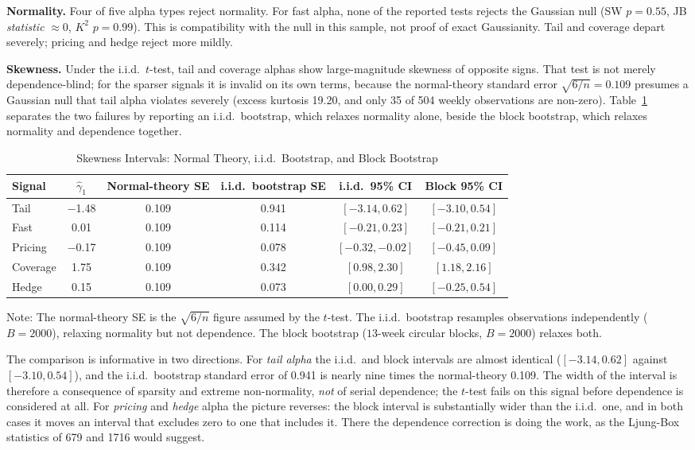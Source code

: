 \documentclass[11pt]{article}
\begin{document}
\textbf{Normality.} Four of five alpha types reject normality. For fast alpha, none of the reported tests rejects the Gaussian null (SW $p = 0.55$, JB \emph{statistic} $\approx 0$, $K^2$ $p = 0.99$). This is compatibility with the null in this sample, not proof of exact Gaussianity. Tail and coverage depart severely; pricing and hedge reject more mildly.

\textbf{Skewness.} Under the i.i.d.\ $t$-test, tail and coverage alphas show large-magnitude skewness of opposite signs. That test is not merely dependence-blind; for the sparser signals it is invalid on its own terms, because the normal-theory standard error $\sqrt{6/n} = 0.109$ presumes a Gaussian null that tail alpha violates severely (excess kurtosis 19.20, and only 35 of 504 weekly observations are non-zero). Table~\ref{tab:bootcompare} separates the two failures by reporting an i.i.d.\ bootstrap, which relaxes normality alone, beside the block bootstrap, which relaxes normality and dependence together.

\begin{table}[H]
\centering
\caption{Skewness Intervals: Normal Theory, i.i.d.\ Bootstrap, and Block Bootstrap}
\label{tab:bootcompare}
\small
\begin{tabular}{@{}lccccc@{}}
\toprule
Signal & $\hat{\gamma}_1$ & Normal-theory SE & i.i.d.\ bootstrap SE & i.i.d.\ 95\% CI & Block 95\% CI \\
\midrule
Tail & $-$1.48 & 0.109 & 0.941 & $[-3.14, 0.62]$ & $[-3.10, 0.54]$ \\
Fast & 0.01 & 0.109 & 0.114 & $[-0.21, 0.23]$ & $[-0.21, 0.21]$ \\
Pricing & $-$0.17 & 0.109 & 0.078 & $[-0.32, -0.02]$ & $[-0.45, 0.09]$ \\
Coverage & 1.75 & 0.109 & 0.342 & $[0.98, 2.30]$ & $[1.18, 2.16]$ \\
Hedge & 0.15 & 0.109 & 0.073 & $[0.00, 0.29]$ & $[-0.25, 0.54]$ \\
\bottomrule
\end{tabular}
\par\vspace{0.3em}
\parbox{\linewidth}{\footnotesize Note: The normal-theory SE is the $\sqrt{6/n}$ figure assumed by the $t$-test. The i.i.d.\ bootstrap resamples observations independently ($B = 2000$), relaxing normality but not dependence. The block bootstrap ($13$-week circular blocks, $B = 2000$) relaxes both.}
\end{table}

The comparison is informative in two directions. For \emph{tail alpha} the i.i.d.\ and block intervals are almost identical ($[-3.14, 0.62]$ against $[-3.10, 0.54]$), and the i.i.d.\ bootstrap standard error of 0.941 is nearly nine times the normal-theory 0.109. The width of the interval is therefore a consequence of sparsity and extreme non-normality, \emph{not} of serial dependence; the $t$-test fails on this signal before dependence is considered at all. For \emph{pricing} and \emph{hedge} alpha the picture reverses: the block interval is substantially wider than the i.i.d.\ one, and in both cases it moves an interval that excludes zero to one that includes it. There the dependence correction is doing the work, as the Ljung-Box statistics of 679 and 1716 would suggest.
\end{document}

